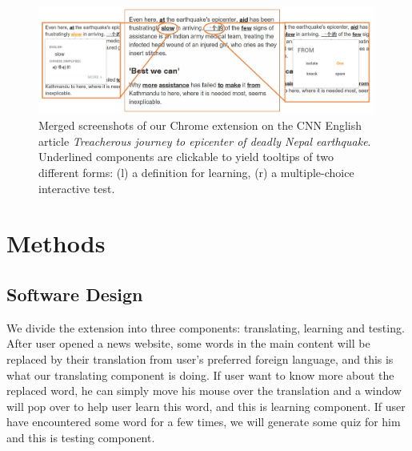 \begin{figure}[ht]
\centering
\includegraphics[width=0.99\textwidth]{chrome_extension.jpg}
\caption{Merged screenshots of our Chrome extension on the CNN English
  article {\it Treacherous journey to epicenter of deadly Nepal
    earthquake}.  Underlined components are clickable to yield
  tooltips of two different forms: (l) a definition for learning, (r)
  a multiple-choice interactive test.  }
\label{fig:chrome_extension_1}
\end{figure}

\section{Methods}

\subsection{Software Design}
We divide the extension into three components: translating, learning and testing. After user opened a news website, 
some words in the main content will be replaced by their translation from user's preferred foreign language, and this is what our translating 
component is doing. If user want to know more about the replaced word, he can simply move his mouse over the translation and a window will pop 
over to help user learn this word, and this is learning component. If user have encountered some word for a few times, we will generate some 
quiz for him and this is testing component.

